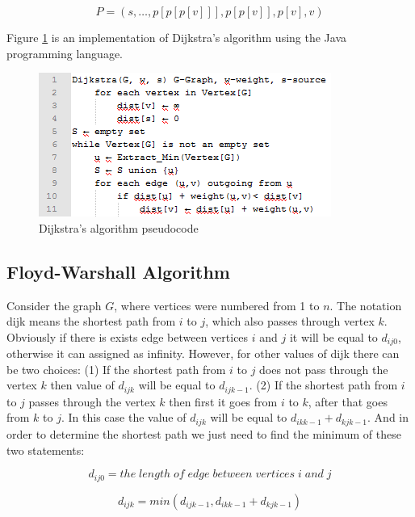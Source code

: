 \begin{equation}\label{finding-path-in-dijkstra}
P = ( s , … , p [ p [ p [ v ] ] ] , p [ p [ v ] ] , p [ v ] , v )	
\end{equation}

Figure \ref{fig:figure6} is an implementation of Dijkstra's algorithm using the Java programming language.

\begin{figure}[h!]
	\centering
	\includegraphics[scale=1]{figure6.png}
	\caption{Dijkstra's algorithm pseudocode}
	\label{fig:figure6}
\end{figure}

\subsection{Floyd-Warshall Algorithm}
Consider the graph $G$, where vertices were numbered from 1 to $n$. The notation dijk means the shortest path from $i$ to $j$, which also passes through vertex $k$. Obviously if there is exists edge between vertices $i$ and $j$ it will be equal to $d_{ij0}$, otherwise it can assigned as infinity. However, for other values of dijk there can be two choices: (1) If the shortest path from $i$ to $j$ does not pass through the vertex $k$ then value of $d_{ijk}$ will be equal to $d_{ijk- 1}$. (2) If the shortest path from $i$ to $j$ passes through the vertex $k$ then first it goes from $i$ to $k$, after that goes from $k$ to $j$. In this case the value of $d_{ijk}$ will be equal to $d_{ikk-1} + d_{kjk-1}$. And in order to determine the shortest path we just need to find the minimum of these two statements:


\begin{equation}\label{length-between-i-j}
	d_{ij0} = the \; length \; of \; edge \; between \; vertices \; i \; and \; j
\end{equation}

\begin{equation}\label{length-between-i-j}
	d_{ijk} = min (d_{ijk-1}, d_{ikk-1} + d_{kjk-1})	
\end{equation}

